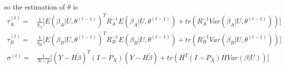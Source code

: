 \documentclass[12pt]{article}
\begin{document}
    so the estimation of $\theta$ is 
    \begin{align}
    \tau^{(t)}_A=&\frac{1}{q_A}\Big[E(\beta_A|U,\theta^{(t-1)})^TR_A^{-1} E(\beta_A|U,\theta^{(t-1)})+tr(R_A^{-1} Var(\beta_A|U,\theta^{(t-1)}))\Big]\\
    \tau^{(t)}_B=&\frac{1}{q_B}\Big[E(\beta_B|U,\theta^{(t-1)})^TR_B^{-1} E(\beta_B|U,\theta^{(t-1)})+tr(R_B^{-1} Var(\beta_B|U,\theta^{(t-1)}))\Big]\\
    \sigma^{(t)}=&\frac{1}{N-p}\Big[(Y-H\tilde{\beta})^T(I-P_X)(Y-H\tilde{\beta})+tr(H^T(I-P_X)H Var(\beta|U))         \Big]
    \end{align}
\end{document}
